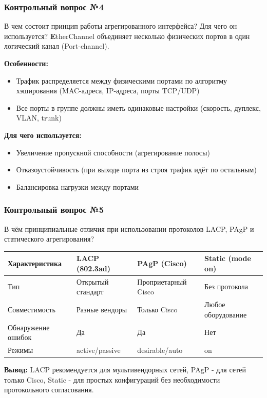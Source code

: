 \begin{frame}
\frametitle{Контрольный вопрос №4}
\begin{block}{В чем состоит принцип работы агрегированного интерфейса? Для чего он используется?}
\textbf EtherChannel объединяет несколько физических портов в один логический канал (Port-channel).

\textbf{Особенности:}
\begin{itemize}
\item Трафик распределяется между физическими портами по алгоритму хэширования (MAC-адреса, IP-адреса, порты TCP/UDP)
\item Все порты в группе должны иметь одинаковые настройки (скорость, дуплекс, VLAN, trunk)
\end{itemize}

\textbf{Для чего используется:}
\begin{itemize}
\item Увеличение пропускной способности (агрегирование полосы)
\item Отказоустойчивость (при выходе порта из строя трафик идёт по остальным)
\item Балансировка нагрузки между портами
\end{itemize}
\end{block}
\end{frame}

\begin{frame}
\frametitle{Контрольный вопрос №5}
\begin{block}{В чём принципиальные отличия при использовании протоколов LACP, PAgP и статического агрегирования?}
\begin{tabular}{|p{2.5cm}|p{3.5cm}|p{3cm}|p{2.5cm}|}
\hline
\textbf{Характеристика} & \textbf{LACP (802.3ad)} & \textbf{PAgP (Cisco)} & \textbf{Static (mode on)} \\
\hline
Тип & Открытый стандарт & Проприетарный Cisco & Без протокола \\
\hline
Совместимость & Разные вендоры & Только Cisco & Любое оборудование \\
\hline
Обнаружение ошибок & Да & Да & Нет \\
\hline
Режимы & active/passive & desirable/auto & on \\
\hline
\end{tabular}

\textbf{Вывод:} LACP рекомендуется для мультивендорных сетей, PAgP - для сетей только Cisco, Static - для простых конфигураций без необходимости протокольного согласования.
\end{block}
\end{frame}

